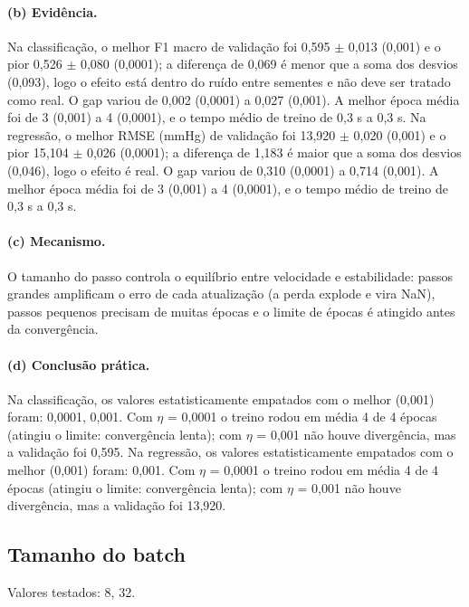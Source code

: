 \documentclass[11pt,a4paper]{article}
\begin{document}
\paragraph{(b) Evidência.} Na classificação, o melhor F1 macro de validação foi 0,595 $\pm$ 0,013 (0,001) e o pior 0,526 $\pm$ 0,080 (0,0001); a diferença de 0,069 é menor que a soma dos desvios (0,093), logo o efeito está dentro do ruído entre sementes e não deve ser tratado como real. O gap variou de 0,002 (0,0001) a 0,027 (0,001). A melhor época média foi de 3 (0,001) a 4 (0,0001), e o tempo médio de treino de 0,3 s a 0,3 s. Na regressão, o melhor RMSE (mmHg) de validação foi 13,920 $\pm$ 0,020 (0,001) e o pior 15,104 $\pm$ 0,026 (0,0001); a diferença de 1,183 é maior que a soma dos desvios (0,046), logo o efeito é real. O gap variou de 0,310 (0,0001) a 0,714 (0,001). A melhor época média foi de 3 (0,001) a 4 (0,0001), e o tempo médio de treino de 0,3 s a 0,3 s.

\paragraph{(c) Mecanismo.} O tamanho do passo controla o equilíbrio entre velocidade e estabilidade: passos grandes amplificam o erro de cada atualização (a perda explode e vira NaN), passos pequenos precisam de muitas épocas e o limite de épocas é atingido antes da convergência.

\paragraph{(d) Conclusão prática.} Na classificação, os valores estatisticamente empatados com o melhor (0,001) foram: 0,0001, 0,001. Com $\eta$ = 0,0001 o treino rodou em média 4 de 4 épocas (atingiu o limite: convergência lenta); com $\eta$ = 0,001 não houve divergência, mas a validação foi 0,595. Na regressão, os valores estatisticamente empatados com o melhor (0,001) foram: 0,001. Com $\eta$ = 0,0001 o treino rodou em média 4 de 4 épocas (atingiu o limite: convergência lenta); com $\eta$ = 0,001 não houve divergência, mas a validação foi 13,920.

\subsection{Tamanho do batch}
Valores testados: 8, 32.
\end{document}
